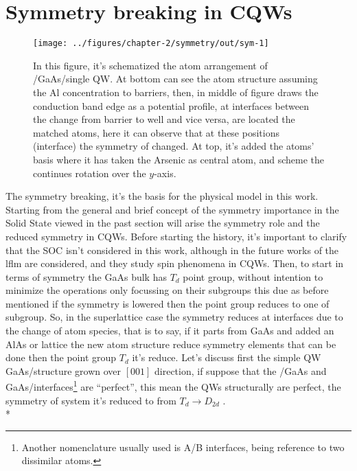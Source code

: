 \section{Symmetry breaking in CQWs}
\label{subsec:chapter-2-symmetry-breaking}
\vspace{-10mm}
\begin{figure}[H]
	\centering
		\texttt{[image: ../figures/chapter-2/symmetry/out/sym-1]}
	\caption{In this figure, it's schematized the atom arrangement of \algaas/GaAs/\algaas single QW. At bottom can see the atom structure assuming the Al concentration to barriers, then, in middle of figure draws the conduction band edge as a potential profile, at interfaces between the change from barrier to well and vice versa,  are located the matched atoms, here it can observe that at these positions (interface) the symmetry of changed.  At top, it's added the atoms' basis where it has taken the Arsenic as central atom, and scheme the continues rotation over the $y$-axis. }
	\label{fig:subsubsection-2.2-qws-symmetry}
\end{figure}
The symmetry breaking, it's the basis for the physical model in this work. Starting from the general and brief concept of the symmetry importance in the Solid State viewed in the past section will arise the symmetry role and the reduced symmetry in CQWs. Before starting the history, it's important to clarify that the SOC isn't considered in this work, although in the future works of the \gls{lflm} are considered, and they study spin phenomena in CQWs. Then, to start in terms of symmetry the GaAs bulk has $T_{d}$ point group, without intention to minimize the operations only focussing on their subgroups this due as before mentioned if the symmetry is lowered then the point group reduces to one of subgroup\cite{dresselhaus2007group}. So, in the superlattice case the symmetry reduces at interfaces due to the change of atom species, that is to say, if it parts from GaAs and added an AlAs or \algaas lattice the new atom structure reduce symmetry elements that can be done then the point group $T_{d}$ it's reduce. 
Let's discuss first the simple QW GaAs/\algaas structure grown over $\left[001\right]$ direction, if suppose that the \algaas/GaAs and GaAs/\algaas interfaces\footnote{Another nomenclature usually used is A/B interfaces, being reference to two dissimilar atoms.} are ``perfect'', this mean the QWs structurally are perfect,  the symmetry of system it's reduced to from $T_{d}\to D_{2d}$ \cite{magri2000anticrossing,ivchenko1996heavylight}.  \\*
